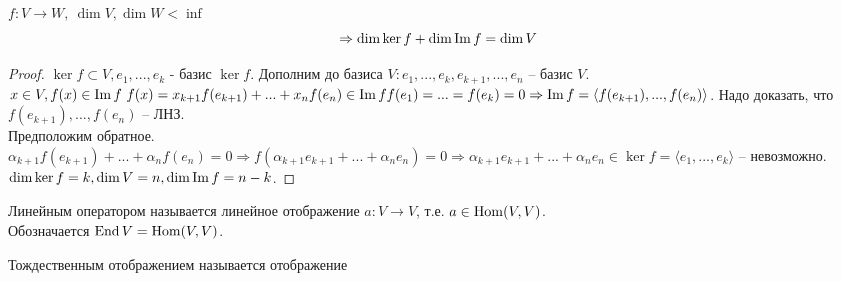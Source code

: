 \begin{Thm}
	$f: V \to W, \ \dim V, \dim W < \inf$ 
	$$ \Rightarrow \dim \ker f + \dim \operatorname{Im} f = \dim V$$
\end{Thm}

\begin{proof}
	$\ker f \subset V, e_1,...,e_k$ - базис $\ker f$. Дополним до базиса $V: e_1, ..., e_k, e_{k+1},..., e_n $ -- базис $V$. \\
	$x \in V, f(x)\in \operatorname{Im} f \ f(x) = x_{k+1} f(e_{k+1}) + ... + x_n f(e_n)  \in \operatorname{Im} f \\
	f(e_1) = ... = f(e_k) = 0 \Rightarrow \operatorname{Im} f = \langle f(e_{k+1}), ..., f(e_n) \rangle $. Надо доказать, что $f(e_{k+1}), ..., f(e_n)$ -- ЛНЗ. \\
	Предположим обратное. $\alpha_{k+1} f(e_{k+1}) + ... + \alpha_n  f(e_n) = 0 \Rightarrow f(\alpha_{k+1}e_{k+1} + ... + \alpha_n e_n) = 0 \Rightarrow\alpha_{k+1} e_{k+1} + ... + \alpha_n e_n \in \ker f = \langle e_1, ..., e_k\rangle$ -- невозможно.\\
	$\dim \ker f = k,\dim V = n, \dim \operatorname{Im} f = n - k$.
\end{proof}


\begin{Def}
	Линейным оператором называется линейное отображение $a: V \to V$, т.е. $a \in \operatorname{Hom}(V, V)$. \\
	Обозначается $\operatorname{End} V = \operatorname{Hom}(V, V)$.
\end{Def}

\begin{Def}
	Тождественным отображением называется отображение  
\end{Def}

\begin{Def}

\end{Def}

